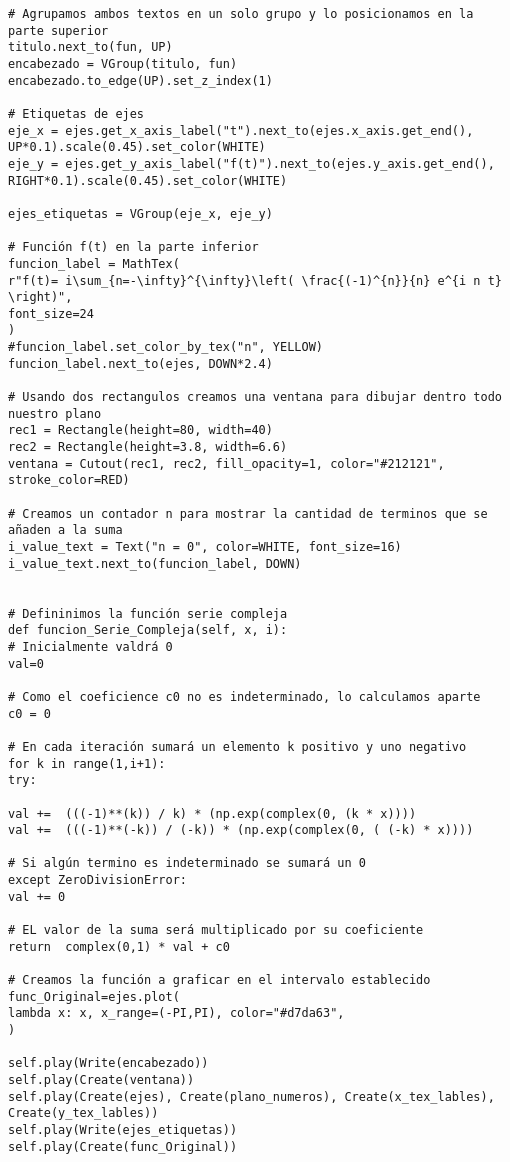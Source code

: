 \begin{longlisting}
\begin{verbatim}
# Agrupamos ambos textos en un solo grupo y lo posicionamos en la parte superior
titulo.next_to(fun, UP)
encabezado = VGroup(titulo, fun)
encabezado.to_edge(UP).set_z_index(1)

# Etiquetas de ejes
eje_x = ejes.get_x_axis_label("t").next_to(ejes.x_axis.get_end(), UP*0.1).scale(0.45).set_color(WHITE)
eje_y = ejes.get_y_axis_label("f(t)").next_to(ejes.y_axis.get_end(), RIGHT*0.1).scale(0.45).set_color(WHITE)

ejes_etiquetas = VGroup(eje_x, eje_y)

# Función f(t) en la parte inferior
funcion_label = MathTex(
r"f(t)= i\sum_{n=-\infty}^{\infty}\left( \frac{(-1)^{n}}{n} e^{i n t}  \right)",
font_size=24
)
#funcion_label.set_color_by_tex("n", YELLOW)
funcion_label.next_to(ejes, DOWN*2.4)

# Usando dos rectangulos creamos una ventana para dibujar dentro todo nuestro plano
rec1 = Rectangle(height=80, width=40)
rec2 = Rectangle(height=3.8, width=6.6)
ventana = Cutout(rec1, rec2, fill_opacity=1, color="#212121", stroke_color=RED)

# Creamos un contador n para mostrar la cantidad de terminos que se añaden a la suma
i_value_text = Text("n = 0", color=WHITE, font_size=16)
i_value_text.next_to(funcion_label, DOWN)


# Defininimos la función serie compleja
def funcion_Serie_Compleja(self, x, i):
# Inicialmente valdrá 0 
val=0

# Como el coeficience c0 no es indeterminado, lo calculamos aparte
c0 = 0

# En cada iteración sumará un elemento k positivo y uno negativo
for k in range(1,i+1):
try:

val +=  (((-1)**(k)) / k) * (np.exp(complex(0, (k * x))))
val +=  (((-1)**(-k)) / (-k)) * (np.exp(complex(0, ( (-k) * x))))

# Si algún termino es indeterminado se sumará un 0
except ZeroDivisionError:
val += 0 

# EL valor de la suma será multiplicado por su coeficiente    
return  complex(0,1) * val + c0

# Creamos la función a graficar en el intervalo establecido
func_Original=ejes.plot(
lambda x: x, x_range=(-PI,PI), color="#d7da63",
)

self.play(Write(encabezado))
self.play(Create(ventana))
self.play(Create(ejes), Create(plano_numeros), Create(x_tex_lables), Create(y_tex_lables))
self.play(Write(ejes_etiquetas))
self.play(Create(func_Original))



\end{verbatim}
\end{longlisting}
